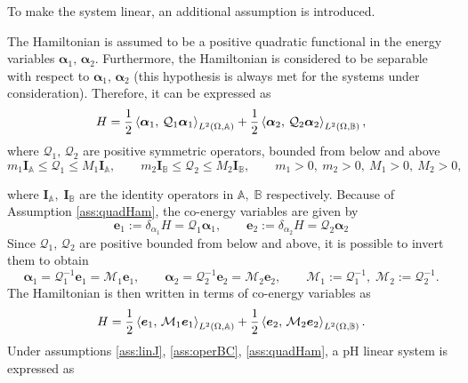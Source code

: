 To make the system linear, an additional assumption is introduced.

\begin{assumption}\label{ass:quadHam}
	The Hamiltonian is assumed to be a positive quadratic functional in the energy variables $\bm{\alpha}_1, \, \bm{\alpha}_2$. Furthermore, the Hamiltonian is considered to be separable  with respect to $\bm{\alpha}_1, \, \bm{\alpha}_2$ (this hypothesis is always met for the systems under consideration). Therefore, it can be expressed as 
	\begin{equation}
		H = \frac{1}{2} \inner[L^2(\Omega, \mathbb{A})]{\bm{\alpha}_{1}}{\mathcal{Q}_1\bm{\alpha}_{1}} + \frac{1}{2} \inner[L^2(\Omega, \mathbb{B})]{\bm{\alpha}_{2}}{\mathcal{Q}_2\bm{\alpha}_{2}},
	\end{equation}
	where $\mathcal{Q}_1, \, \mathcal{Q}_2$ are positive symmetric operators, bounded from below and above
	\begin{equation*}
	m_1 \bm{I}_\mathbb{A} \le\mathcal{Q}_1 \le M_1 \bm{I}_\mathbb{A}, \qquad  m_2 \bm{I}_\mathbb{B} \le \mathcal{Q}_2 \le M_2 \bm{I}_\mathbb{B}, \qquad m_1>0, \ m_2>0, \ M_1>0, \ M_2>0,
	\end{equation*} 
\end{assumption}
where $\bm{I}_\mathbb{A}, \; \bm{I}_\mathbb{B}$ are the identity operators in $\mathbb{A}, \; \mathbb{B}$ respectively. 
Because of Assumption \ref{ass:quadHam}, the co-energy variables are given by 
\begin{equation}\label{eq:e_lin}
	\bm{e}_1 := \delta_{\alpha_1} H = \mathcal{Q}_1 \bm{\alpha}_1, \qquad \bm{e}_2 := \delta_{\alpha_2} H = \mathcal{Q}_2 \bm{\alpha}_2
\end{equation}
Since $\mathcal{Q}_1, \, \mathcal{Q}_2$ are positive bounded from below and above, it is possible to invert them to obtain
\begin{equation}\label{eq:alpha_lin}
\bm{\alpha}_1 = \mathcal{Q}_1^{-1}\bm{e}_1 = \mathcal{M}_1\bm{e}_1, \qquad  \bm{\alpha}_2 = \mathcal{Q}_2^{-1} \bm{e}_2 = \mathcal{M}_2 \bm{e}_2, \qquad \mathcal{M}_1 := \mathcal{Q}_1^{-1}, \; \mathcal{M}_2 := \mathcal{Q}_2^{-1}.
\end{equation}
The Hamiltonian is then written in terms of co-energy variables as 
\begin{equation}\label{eq:H_coenergy}
H = \frac{1}{2} \inner[L^2(\Omega, \mathbb{A})]{\bm{e}_{1}}{\mathcal{M}_1\bm{e}_{1}} + \frac{1}{2} \inner[L^2(\Omega, \mathbb{B})]{\bm{e}_{2}}{\mathcal{M}_2\bm{e}_{2}}.
\end{equation}
Under assumptions \ref{ass:linJ}, \ref{ass:operBC}, \ref{ass:quadHam}, a pH linear system is expressed as 

